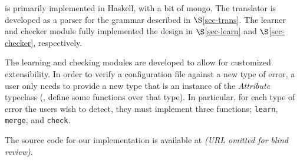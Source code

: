 \app is primarily implemented in Haskell, with a bit of mongo.
The translator is developed as a parser for the grammar described in $\S$\ref{sec-trans}. 
The learner and checker module fully implemented the design in $\S$\ref{sec-learn} and $\S$\ref{sec-checker}, respectively. 
 
The learning and checking modules are developed to allow
for customized extensibility. In order to verify a configuration file
against a new type of error, a user only needs to provide a new type
that is an instance of the \textit{Attribute} typeclass (\ie, define some
functions over that type). 
In particular, for each type of error the users
wish to detect, they must implement three functions;
\lstinline{learn}, \lstinline{merge}, and \lstinline{check}.

The source code for our implementation is available at {\em (URL omitted for blind review)}.
